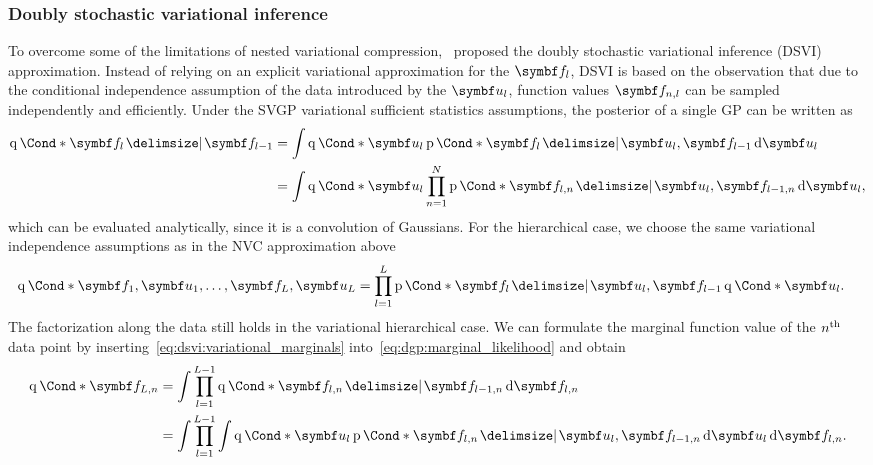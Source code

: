 \subsubsection{Doubly stochastic variational inference}
\label{toc:dsvi}
To overcome some of the limitations of nested variational compression,~\textcite{salimbeni_doubly_2017} proposed the doubly stochastic variational inference (DSVI) approximation.
Instead of relying on an explicit variational approximation for the $\mat{f}_l$, DSVI is based on the observation that due to the conditional independence assumption of the data introduced by the $\mat{u}_l$, function values $\mat{f}_{n,l}$ can be sampled independently and efficiently.
Under the SVGP variational sufficient statistics assumptions, the posterior of a single GP can be written as
\begin{align}
    \begin{split}
        \label{eq:dsvi:variational_marginals}
        \Variat*{\mat{f}_l \given \mat{f}_{l-1}}
        &=
        \int \Variat*{\mat{u}_l}
        \Prob*{\mat{f}_l \given \mat{u}_l, \mat{f}_{l-1}}
        \diff \mat{u}_l
        \\
        &=
        \int \Variat*{\mat{u}_l}
        \prod_{n=1}^N \Prob*{\mat{f}_{l,n} \given \mat{u}_l, \mat{f}_{l-1, n}}
        \diff \mat{u}_l,
    \end{split}
\end{align}
which can be evaluated analytically, since it is a convolution of Gaussians.
For the hierarchical case, we choose the same variational independence assumptions as in the NVC approximation above
\begin{align}
    \begin{split}
        \label{eq:dsvi:variational_distribution}
        \Variat*{\mat{f}_1, \mat{u}_1, \dots, \mat{f}_L, \mat{u}_L}
        &= \prod_{l=1}^L \Prob*{\mat{f}_l \given \mat{u}_l, \mat{f}_{l-1}} \Variat*{\mat{u}_l}.
    \end{split}
\end{align}
The factorization along the data still holds in the variational hierarchical case.
We can formulate the marginal function value of the $n^{\text{th}}$ data point by inserting~\cref{eq:dsvi:variational_marginals} into~\cref{eq:dgp:marginal_likelihood} and obtain
\begin{align}
    \begin{split}
        \label{eq:dsvi:variational_layers}
        \Variat*{\mat{f}_{L,n}}
        &= \int \prod_{l=1}^{L-1} \Variat*{\mat{f}_{l,n} \given \mat{f}_{l-1,n}} \diff \mat{f}_{l, n} \\
        &= \int \prod_{l=1}^{L-1} \int \Variat*{\mat{u}_l} \Prob*{\mat{f}_{l,n} \given \mat{u}_l, \mat{f}_{l-1, n}} \diff \mat{u}_l \diff \mat{f}_{l, n}.
    \end{split}
\end{align}
